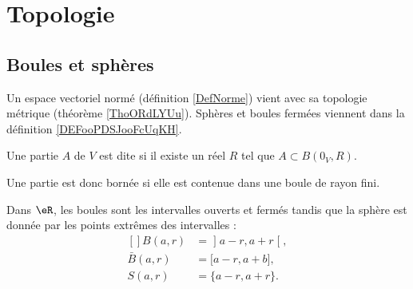
\section{Topologie}

\subsection{Boules et sphères}

Un espace vectoriel normé (définition \ref{DefNorme}) vient avec sa topologie métrique (théorème \ref{ThoORdLYUu}). Sphères et boules fermées viennent dans la définition \ref{DEFooPDSJooFcUqKH}.

\begin{definition}
	Une partie \( A\) de \( V\) est dite  si il existe un réel \( R\) tel que \( A\subset B(0_V,R)\).
\end{definition}
Une partie est donc bornée si elle est contenue dans une boule de rayon fini.

\begin{example}
	Dans \( \eR\), les boules sont  les intervalles ouverts et fermés tandis que la sphère est donnée par les points extrêmes des intervalles :
	\begin{equation}
		\begin{aligned}[]
			B(a,r)      & =\mathopen] a-r , a+r \mathclose[, \\
			\bar B(a,r) & =\mathopen[ a-r , a+b \mathclose], \\
			S(a,r)      & =\{ a-r,a+r \}.
		\end{aligned}
	\end{equation}
\end{example}

